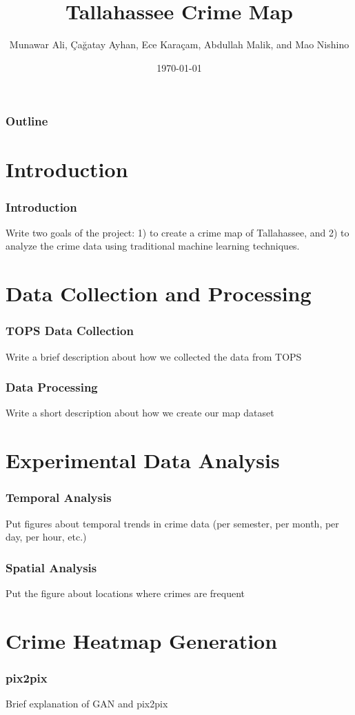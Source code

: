 \documentclass{beamer}
\title{Tallahassee Crime Map}
\author{Munawar Ali, Çağatay Ayhan, Ece Karaçam, Abdullah Malik, and Mao Nishino}
\date{\today}
\begin{document}
\begin{frame}
    \titlepage
\end{frame}

\begin{frame}
    \frametitle{Outline}
    \tableofcontents
\end{frame}

\section{Introduction}
\begin{frame}
    \frametitle{Introduction}
    Write two goals of the project: 1) to create a crime map of Tallahassee, and 2) to analyze the crime data using traditional machine learning techniques.
\end{frame}

\section{Data Collection and Processing}
\begin{frame}
    \frametitle{TOPS Data Collection}
    Write a brief description about how we collected the data from TOPS
\end{frame}

\begin{frame}
    \frametitle{Data Processing}
    Write a short description about how we create our map dataset
\end{frame}

\section{Experimental Data Analysis}
\begin{frame}
    \frametitle{Temporal Analysis}
    Put figures about temporal trends in crime data (per semester, per month, per day, per hour, etc.)
\end{frame}

\begin{frame}
    \frametitle{Spatial Analysis}
    Put the figure about locations where crimes are frequent
\end{frame}

\section{Crime Heatmap Generation}

\begin{frame}
    \frametitle{pix2pix}
    Brief explanation of GAN and pix2pix
\end{frame}
\end{document}
